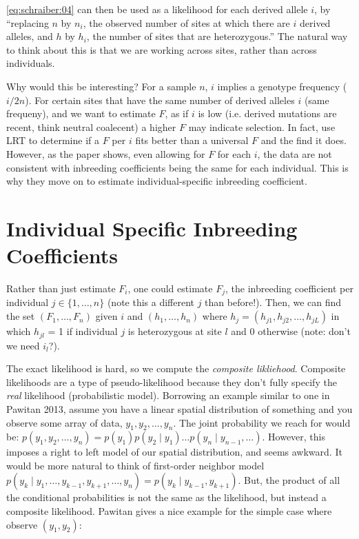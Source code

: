 \documentclass[12pt]{article}\usepackage[]{graphicx}\usepackage[]{color}
\begin{document}
\autoref{eq:schraiber:04} can then be used as a likelihood for each
derived allele $i$, by ``replacing $n$ by $n_i$, the observed number
of sites at which there are $i$ derived alleles, and $h$ by $h_i$, the
number of sites that are heterozygous.'' The natural way to think
about this is that we are working across sites, rather than
across individuals.

Why would this be interesting? For a sample $n$, $i$ implies a
genotype frequency ($i/2n$). For certain sites that have the same
number of derived alleles $i$ (same frequeny), and we want to estimate
$F$, as if $i$ is low (i.e. derived mutations are recent, think
neutral coalecent) a higher $F$ may indicate selection. In fact,
\citet{Schraiber:2012it} use LRT to determine if a $F$ per $i$ fits
better than a universal $F$ and the find it does. However, as the
paper shows, even allowing for $F$ for each $i$, the data are not
consistent with inbreeding coefficients being the same for each
individual. This is why they move on to estimate individual-specific
inbreeding coefficient.

\section{Individual Specific Inbreeding Coefficients}

Rather than just estimate $F_i$, one could estimate $F_j$, the
inbreeding coefficient per individual $j \in \{1, \ldots, n\}$ (note
this a different $j$ than before!). Then, we can find the set $(F_1,
\ldots, F_n)$ given $i$ and $(h_1, \ldots, h_n)$ where $h_j = (h_{j1},
h_{j2}, \ldots, h_{jL})$ in which $h_{jl}$ = 1 if individual $j$ is
heterozygous at site $l$ and 0 otherwise (note: don't we need $i_l$?).

The exact likelihood is hard, so we compute the \emph{composite 
likliehood}. Composite likelihoods are a type of pseudo-likelihood
because they don't fully specify the \emph{real} likelihood
(probabilistic model). Borrowing an example similar to one in Pawitan
2013, assume you have a linear spatial distribution of something and
you observe some array of data, $y_1, y_2, \ldots, y_n$. The joint
probability we reach for would be: $p(y_1, y_2, \ldots, y_n) = p(y_1)
p(y_2 \mid y_1) \ldots p(y_n \mid y_{n-1}, \ldots)$. However, this
imposes a right to left model of our spatial distribution, and seems
awkward. It would be more natural to think of first-order neighbor
model $p(y_k \mid y_1, \ldots, y_{k-1}, y_{k+1}, \ldots, y_n) = p(y_k
\mid y_{k-1}, y_{k+1})$. But, the product of all the conditional
probabilities is not the same as the likelihood, but instead a
composite likelihood. Pawitan gives a nice example for the simple case
where observe $(y_1, y_2)$:
\end{document}

